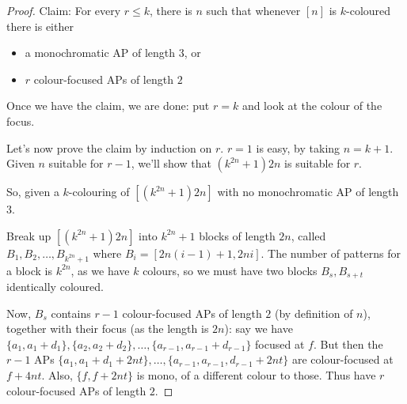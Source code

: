 \documentclass{article}
\begin{document}
\begin{proof}
  Claim: For every $r \leq k$, there is $n$ such that whenever $[n]$ is $k$-coloured there is either
  \begin{itemize}
    \item a monochromatic AP of length $3$, or
    \item $r$ colour-focused APs of length $2$
  \end{itemize}

  Once we have the claim, we are done: put $r=k$ and look at the colour of the focus.

  Let's now prove the claim by induction on $r$. $r=1$ is easy, by taking $n=k+1$.
  Given $n$ suitable for $r-1$, we'll show that $(k^{2n} + 1) 2n$ is suitable for $r$.

  So, given a $k$-colouring of $[(k^{2n}+1) 2n]$ with no monochromatic AP of length $3$.

  \begin{center}
  \end{center}
  \begin{center}
  \end{center}
  Break up $[(k^{2n}+1)2n]$ into $k^{2n}+1$ blocks of length $2n$, called $B_1, B_2, \dotsc, B_{k^{2n}+1}$ where $B_i = [2n(i-1)+1, 2ni]$.
  The number of patterns for a block is $k^{2n}$, as we have $k$ colours, so we must have two blocks $B_s, B_{s+t}$ identically coloured.

  Now, $B_s$ contains $r-1$ colour-focused APs of length $2$ (by definition of $n$), together with their focus (as the length is $2n$): say we have
  $\{a_1, a_1 + d_1\}, \{a_2, a_2 + d_2\}, \dotsc, \{a_{r-1}, a_{r-1} + d_{r-1}\}$ focused at $f$.
  But then the $r-1$ APs $\{a_1, a_1 + d_1 + 2nt\}, \dotsc, \{a_{r-1}, a_{r-1}, d_{r-1} + 2nt\}$ are colour-focused at $f + 4nt$.
  Also, $\{f, f+2nt\}$ is mono, of a different colour to those.
  Thus have $r$ colour-focused APs of length $2$.
\end{proof}
\end{document}
